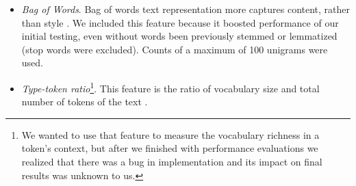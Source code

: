 \documentclass[10pt, a4paper]{article}
\begin{document}
\begin{itemize}
	\item \emph{Bag of Words}. Bag of words text representation more captures content, rather than style \citep{stamatatos-2009a}. We included this feature because it boosted performance of our initial testing, even without words been previously stemmed or lemmatized (stop words were excluded). Counts of a maximum of 100 unigrams were used.
	\item \emph{Type-token ratio}\footnote{We wanted to use that feature to measure the vocabulary richness in a token's context, but after we finished with performance evaluations we realized that there was a bug in implementation and its impact on final results was unknown to us.}. This feature is the ratio of vocabulary size and total number of tokens of the text \citep{stamatatos-2009a}.
\end{itemize}

\end{document}
